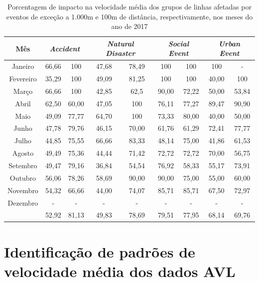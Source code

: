 \documentclass[
	12pt,				%
	oneside,			%
	a4paper,			%
	english,			%
	brazil				%
	]{abntex2ppgsi}
\begin{document}
\begin{table}[!htb]
\centering
\caption {Porcentagem de impacto na velocidade média dos grupos de linhas afetadas por eventos de exceção a 1.000m e 100m de distância, respectivamente, nos meses do ano de 2017}
\label {tab:exceptEventVelocityImpAll}
\begin{tabular}{c|cc|cc|cc|cc}
\toprule
\textbf{Mês} & \multicolumn{2}{c}{\textit{\textbf{Accident}}} & \multicolumn{2}{c}{\textit{\textbf{Natural Disaster}}} & \multicolumn{2}{c}{\textit{\textbf{Social Event}}} &
\multicolumn{2}{c}{\textit{\textbf{Urban Event}}}\\
\midrule
Janeiro & 66,66 &  100 & 
 47,68 &  78,49 & 
 100 & 100 &
 100 & - \\
\hline
Fevereiro & 35,29  &  100 &
 49,09 &  81,25 &
 100 & 100 &
 40,00 & 100 \\
\hline
Março  & 66,66  &  100 & 
 42,85 &  62,5 &
90,00 & 72,22 &
50,00 & 53,84 \\
\hline
Abril & 62,50 & 60,00 & 
47,05  & 100 & 
76,11 & 77,27 & 
89,47 &  90,90\\
\hline
Maio & 49,09 &  77,77 &
64,70 &  100 &
73,33 & 80,00 &
40,00 & 50,00 \\
\hline
Junho & 47,78 &  79,76 &
 46,15 &  70,00 &
 61,76 & 61,29 &
72,41 & 77,77 \\
\hline
Julho & 44,85  &  75,55 &
 66,66  & 83,33 &
48,14  & 75,00 &
41,86 & 61,53 \\
\hline
Agosto & 49,49 & 75,36 &
  44,44 & 71,42 &
  72,72 & 72,72 & 
70,00  & 56,75 \\
\hline
Setembro & 49,47  & 79,16 &
36,84  & 54,54 &
76,92  & 58,33 & 
55,17 & 73,91 \\
\hline
Outubro & 56,06 & 78,26 &
58,69  & 90,00 &
90,00  & 75,00 &
55,00 & 60,00 \\
\hline
Novembro & 54,32 & 66,66 &
 44,00 & 74,07 &
85,71  & 85,71 &
67,50  & 72,97 \\
\hline
Dezembro & - & - & - & - & - & - & - & -  \\
\midrule
{} & 52,92 & 81,13 & 49,83 & 78,69 & 79,51 & 77,95 & 68,14 & 69,76  \\
\bottomrule
\end{tabular}
\end{table}


\chapter{Identificação de padrões de velocidade média dos dados AVL}
\end{document}
